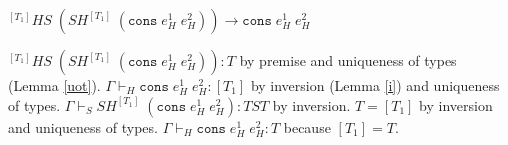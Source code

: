 \begin{case}
$^{[T_{1}]}HS\;(SH^{[T_{1}]}\;(\mathtt{cons}\;e_{H}^{1}\;e_{H}^{2}))\rightarrow\mathtt{cons}\;e_{H}^{1}\;e_{H}^{2}$

$^{[T_{1}]}HS\;(SH^{[T_{1}]}\;(\mathtt{cons}\;e_{H}^{1}\;e_{H}^{2})):T$ by premise and uniqueness of types (Lemma \ref{uot}).  $\Gamma\vdash_{H}\mathtt{cons}\;e_{H}^{1}\;e_{H}^{2}:[T_{1}]$ by inversion (Lemma \ref{i}) and uniqueness of types.  $\Gamma\vdash_{S}SH^{[T_{1}]}\;(\mathtt{cons}\;e_{H}^{1}\;e_{H}^{2}):TST$ by inversion.  $T=[T_{1}]$ by inversion and uniqueness of types.  $\Gamma\vdash_{H}\mathtt{cons}\;e_{H}^{1}\;e_{H}^{2}:T$ because $[T_{1}]=T$.
\end{case}